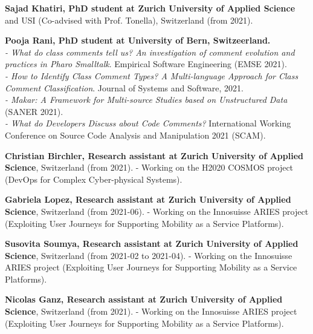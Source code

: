 \documentclass[10pt]{article}
\begin{document}
\begin{bibsection}

\item \textbf{Sajad Khatiri, PhD student at Zurich University of Applied Science} and USI (Co-advised with Prof. Tonella), Switzerland (from 2021).\\ 

\item \textbf{Pooja Rani, PhD student at University of Bern, Switzeerland. }\\
       \textit{- What do class comments tell us? An investigation of comment evolution and practices in Pharo Smalltalk}. Empirical Software Engineering (EMSE 2021).\\
       \textit{- How to Identify Class Comment Types? A Multi-language Approach for Class Comment Classification}. Journal of Systems and Software, 2021. \\
       \textit{- Makar: A Framework for Multi-source Studies based on Unstructured Data}  (SANER 2021).\\
       \textit{- What do Developers Discuss about Code Comments?} International Working Conference on Source Code Analysis and Manipulation 2021 (SCAM).\\

\item \textbf{Christian Birchler, Research assistant at Zurich University of Applied Science}, Switzerland (from 2021). 
- Working on the H2020 COSMOS project (DevOps for Complex Cyber-physical Systems).\\ 

\item \textbf{Gabriela Lopez, Research assistant at Zurich University of Applied Science}, Switzerland (from 2021-06). 
- Working on the Innosuisse ARIES project (Exploiting User Journeys for Supporting Mobility as a Service Platforms).\\ 

\item \textbf{Susovita Soumya, Research assistant at Zurich University of Applied Science}, Switzerland (from 2021-02 to 2021-04). 
- Working on the Innosuisse ARIES project (Exploiting User Journeys for Supporting Mobility as a Service Platforms).\\ 

\item \textbf{Nicolas Ganz, Research assistant at Zurich University of Applied Science}, Switzerland (from 2021). 
- Working on the Innosuisse ARIES project (Exploiting User Journeys for Supporting Mobility as a Service Platforms).\\


\end{bibsection}
\end{document}
